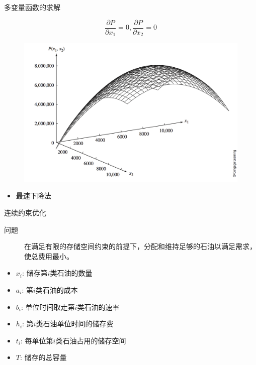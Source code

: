 \documentclass[mathserif, table]{beamer}
\begin{document}
\begin{frame}{多变量函数的求解}

  \[
    \frac{\partial P}{\partial x_1} = 0, \frac{\partial P}{\partial x_2} = 0
  \]

  \begin{figure}
    \centering
    \includegraphics[width=.6\textwidth{}]{13_9.png}
  \end{figure}

  \begin{itemize}
  \item 最速下降法
  \end{itemize}
\end{frame}

\begin{frame}{连续约束优化}
  \begin{description}
  \item[问题] 在满足有限的存储空间约束的前提下，分配和维持足够的石油以满足需求，
    使总费用最小。
  \end{description}
  \begin{itemize}
  \item $x_i$: 储存第$i$类石油的数量
  \item $a_i$: 第$i$类石油的成本
  \item $b_i$: 单位时间取走第$i$类石油的速率
  \item $h_i$: 第$i$类石油单位时间的储存费
  \item $t_i$: 每单位第$i$类石油占用的储存空间
  \item $T$: 储存的总容量
  \end{itemize}
  
\end{frame}
\end{document}
